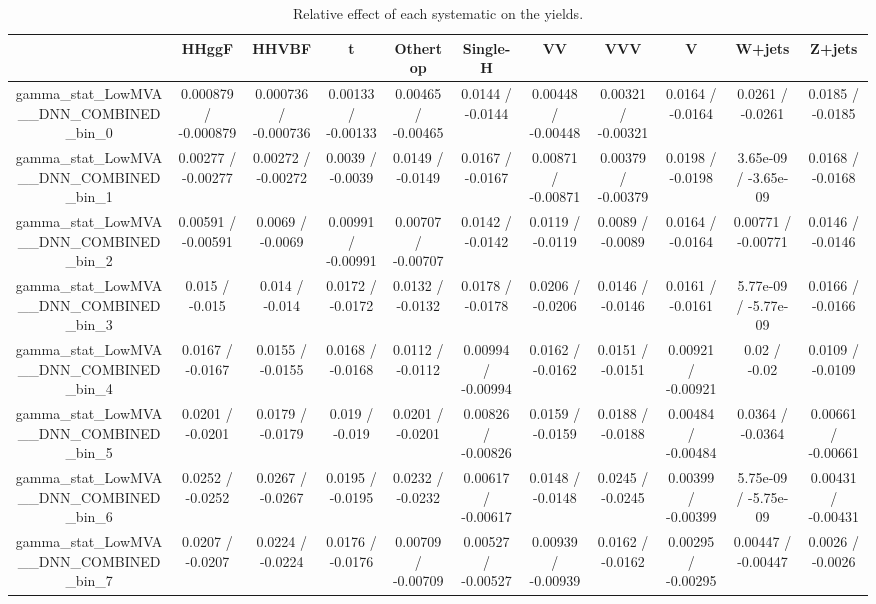 \documentclass[10pt]{article}
\begin{document}
\begin{table}[htbp]
\begin{center}
\begin{tabular}{|c|c|c|c|c|c|c|c|c|c|c|}
\hline 
      & HHggF      & HHVBF      & t      & Othertop      & Single-H      & VV      & VVV      & V      & W+jets      & Z+jets \\ 
\hline 
  gamma_stat_LowMVA__DNN_COMBINED_bin_0 & 0.000879 / -0.000879 & 0.000736 / -0.000736 & 0.00133 / -0.00133 & 0.00465 / -0.00465 & 0.0144 / -0.0144 & 0.00448 / -0.00448 & 0.00321 / -0.00321 & 0.0164 / -0.0164 & 0.0261 / -0.0261 & 0.0185 / -0.0185 \\ 
  gamma_stat_LowMVA__DNN_COMBINED_bin_1 & 0.00277 / -0.00277 & 0.00272 / -0.00272 & 0.0039 / -0.0039 & 0.0149 / -0.0149 & 0.0167 / -0.0167 & 0.00871 / -0.00871 & 0.00379 / -0.00379 & 0.0198 / -0.0198 & 3.65e-09 / -3.65e-09 & 0.0168 / -0.0168 \\ 
  gamma_stat_LowMVA__DNN_COMBINED_bin_2 & 0.00591 / -0.00591 & 0.0069 / -0.0069 & 0.00991 / -0.00991 & 0.00707 / -0.00707 & 0.0142 / -0.0142 & 0.0119 / -0.0119 & 0.0089 / -0.0089 & 0.0164 / -0.0164 & 0.00771 / -0.00771 & 0.0146 / -0.0146 \\ 
  gamma_stat_LowMVA__DNN_COMBINED_bin_3 & 0.015 / -0.015 & 0.014 / -0.014 & 0.0172 / -0.0172 & 0.0132 / -0.0132 & 0.0178 / -0.0178 & 0.0206 / -0.0206 & 0.0146 / -0.0146 & 0.0161 / -0.0161 & 5.77e-09 / -5.77e-09 & 0.0166 / -0.0166 \\ 
  gamma_stat_LowMVA__DNN_COMBINED_bin_4 & 0.0167 / -0.0167 & 0.0155 / -0.0155 & 0.0168 / -0.0168 & 0.0112 / -0.0112 & 0.00994 / -0.00994 & 0.0162 / -0.0162 & 0.0151 / -0.0151 & 0.00921 / -0.00921 & 0.02 / -0.02 & 0.0109 / -0.0109 \\ 
  gamma_stat_LowMVA__DNN_COMBINED_bin_5 & 0.0201 / -0.0201 & 0.0179 / -0.0179 & 0.019 / -0.019 & 0.0201 / -0.0201 & 0.00826 / -0.00826 & 0.0159 / -0.0159 & 0.0188 / -0.0188 & 0.00484 / -0.00484 & 0.0364 / -0.0364 & 0.00661 / -0.00661 \\ 
  gamma_stat_LowMVA__DNN_COMBINED_bin_6 & 0.0252 / -0.0252 & 0.0267 / -0.0267 & 0.0195 / -0.0195 & 0.0232 / -0.0232 & 0.00617 / -0.00617 & 0.0148 / -0.0148 & 0.0245 / -0.0245 & 0.00399 / -0.00399 & 5.75e-09 / -5.75e-09 & 0.00431 / -0.00431 \\ 
  gamma_stat_LowMVA__DNN_COMBINED_bin_7 & 0.0207 / -0.0207 & 0.0224 / -0.0224 & 0.0176 / -0.0176 & 0.00709 / -0.00709 & 0.00527 / -0.00527 & 0.00939 / -0.00939 & 0.0162 / -0.0162 & 0.00295 / -0.00295 & 0.00447 / -0.00447 & 0.0026 / -0.0026 \\ 
\hline 
\end{tabular} 
\caption{Relative effect of each systematic on the yields.} 
\end{center} 
\end{table} 
\end{document}
